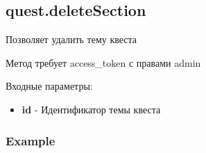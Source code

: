 \subsection{quest.deleteSection}

Позволяет удалить тему квеста

Метод требует access\_token с правами admin

Входные параметры:
\begin{itemize}
  \item \textbf{id} - Идентификатор темы квеста
\end{itemize}

\subsubsection{Example}
\begin{Verbatim}[frame=single]

\end{Verbatim}